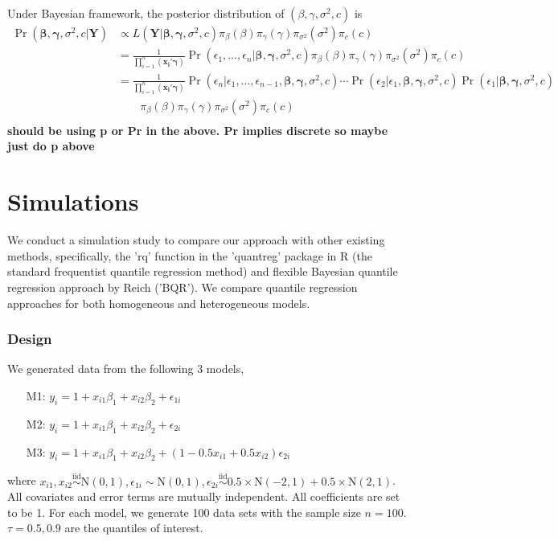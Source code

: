 \documentclass[12pt]{article}
\DeclareMathOperator{\pr}{Pr}
\begin{document}
Under Bayesian framework, the posterior distribution of $(\beta,
\gamma, \sigma^2, c)$ is 
\begin{align*}
\pr(\bm{\beta}, \bm{\gamma}, \sigma^2, c|\bm{Y}) & \propto L(\bm{Y}|
\bm{\beta}, \bm{\gamma}, \sigma^2, c) \pi_{\beta}(\beta)
\pi_{\gamma}(\gamma) \pi_{\sigma^2}(\sigma^2) \pi_c(c) \\
& = \frac{1}{\prod_{i=1}^n (\bm{x_i'\gamma})} \pr \left( \epsilon_1,
  \ldots, \epsilon_n | \bm{\beta}, \bm{\gamma}, \sigma^2, c\right)
\pi_{\beta}(\beta)
\pi_{\gamma}(\gamma) \pi_{\sigma^2}(\sigma^2) \pi_c(c) \\
& = \frac{1}{\prod_{i=1}^n (\bm{x_i'\gamma})} \pr \left(\epsilon_n| \epsilon_1,
  \ldots, \epsilon_{n-1} , \bm{\beta}, \bm{\gamma}, \sigma^2, c\right)
\cdots  \pr \left(\epsilon_2| \epsilon_1, \bm{\beta}, \bm{\gamma},
  \sigma^2, c\right)  \pr \left(\epsilon_1| \bm{\beta}, \bm{\gamma},
  \sigma^2, c\right)\\
& \qquad 
\pi_{\beta}(\beta)
\pi_{\gamma}(\gamma) \pi_{\sigma^2}(\sigma^2) \pi_c(c) \\
\end{align*}
{\bf should be using p or Pr in the above.  Pr implies discrete so
  maybe just do p above}

\section{Simulations}
We
conduct a simulation study to compare our approach with other existing
methods, specifically, the 'rq' function in the 'quantreg' package in
R 
(the standard frequentist quantile regression method) and 
flexible Bayesian quantile regression approach by Reich
('BQR'). 
We compare quantile regression approaches
for both homogeneous and heterogeneous models. 

\subsubsection{Design}
We generated data from the following 3 models,
\begin{itemize}
\item [M1:] $y_i = 1 + x_{i1}\beta_1 + x_{i2}\beta_2 + \epsilon_{1i}$
\item [M2:] $y_i = 1 + x_{i1}\beta_1 + x_{i2}\beta_2 + \epsilon_{2i}$
\item [M3:]  $y_i = 1 + x_{i1}\beta_1 + x_{i2}\beta_2 +
  (1-0.5x_{i1}+0.5x_{i2}) \epsilon_{2i}$
\end{itemize}
where $x_{i1} , x_{i2} \stackrel{\text{iid}}{\sim} \mathrm{N}(0,1),
\epsilon_{1i} \sim \mathrm{N}(0,1), \epsilon_{2i} 
\stackrel{\text{iid}}{\sim} 0.5 \times \mathrm{N}(-2,1) + 
0.5 \times \mathrm{N}(2,1)
$. All covariates and error terms are mutually independent. All
coefficients are set to be 1. For each model, we generate 100 data
sets with the sample size $n=100$. $\tau=0.5, 0.9$ are the quantiles
of interest.  
\end{document}
